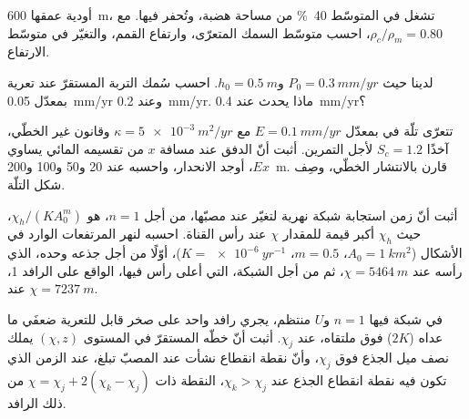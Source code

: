 \begin{exercise}[$\star\star$]\label{exo:b3:quantitative-geomorphology:8}
أودية عمقها \qty{600}{m}، تشغل في المتوسّط \qty{40}{\percent} من
مساحة هضبة، وتُحفر فيها. مع $\rho_c/\rho_m = 0.80$، احسب
متوسّط السمك المتعرّى، وارتفاع القمم، والتغيّر في متوسّط
الارتفاع.
\end{exercise}

\begin{exercise}[$\star\star$]\label{exo:b3:quantitative-geomorphology:9}
لدينا  حيث $P_0 = \qty{0.3}{mm/yr}$ و$h_0 =
\qty{0.5}{m}$. احسب سُمك التربة المستقرّ عند تعرية بمعدّل
\qty{0.05}{mm/yr} وعند \qty{0.2}{mm/yr}. ماذا يحدث عند
\qty{0.4}{mm/yr}؟
\end{exercise}

\begin{exercise}[$\star\star\star$]\label{exo:b3:quantitative-geomorphology:10}
تتعرّى تلّة في  بمعدّل $E = \qty{0.1}{mm/yr}$ مع $\kappa =
\qty{5e-3}{m^2/yr}$ وقانون  غير الخطّي، آخذًا
$S_c = 1.2$ لأجل التمرين. أثبت أنّ الدفق عند مسافة $x$ من
تقسيمه المائي يساوي $E x$، أوجد الانحدار، واحسبه عند 20 و50 و100
و\qty{200}{m}. قارن بالانتشار الخطّي، وصِف شكل
التلّة.
\end{exercise}

\begin{exercise}[$\star\star\star$]\label{exo:b3:quantitative-geomorphology:11}
أثبت أنّ زمن استجابة شبكة نهرية لتغيّر عند مصبّها،
من أجل $n = 1$، هو $\chi_h/(K A_0^m)$، حيث $\chi_h$ أكبر قيمة للمقدار
$\chi$ عند رأس القناة. احسبه لنهر المرتفعات الوارد في الأشكال
($A_0 = \qty{1}{km^2}$، $m = 0.5$، $K = \qty{e-6}{yr^{-1}}$)، أوّلًا من أجل
جذعه وحده، الذي رأسه عند $\chi = \qty{5464}{m}$، ثم من أجل الشبكة،
التي أعلى رأس فيها، الواقع على الرافد 1، عند $\chi = \qty{7237}{m}$.
\end{exercise}

\begin{exercise}[$\star\star\star$]\label{exo:b3:quantitative-geomorphology:12}
في شبكة فيها $n = 1$ و$U$ منتظم، يجري رافد واحد على صخر قابل للتعرية ضعفَي
ما عداه ($2K$) فوق ملتقاه، عند $\chi_j$. أثبت أنّ
خطّه المستقرّ في المستوى $(\chi, z)$ يملك نصف ميل الجذع
فوق $\chi_j$، وأنّ نقطة انقطاع نشأت عند المصبّ تبلغ،
عند الزمن الذي تكون فيه نقطة انقطاع الجذع عند $\chi_k > \chi_j$، النقطة
ذات $\chi = \chi_j + 2(\chi_k - \chi_j)$ من ذلك الرافد.
\end{exercise}

